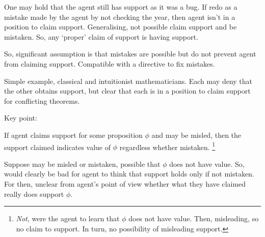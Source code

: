 \begin{note}[Support]
  One may hold that the agent still has support as it was a bug.
  If redo as a mistake made by the agent by not checking the year, then agent isn't in a position to claim support.
  Generalising, not possible claim support and be mistaken.
  So, any `proper' claim of support is having support.

  So, significant assumption is that mistakes are possible but do not prevent agent from claiming support.
  Compatible with a directive to fix mistakes.

  Simple example, classical and intuitionist mathematicians.
  Each may deny that the other obtains support, but clear that each is in a position to claim support for conflicting theorems.

  Key point:
  \begin{proposition}\label{prop:supp:independence}
    If agent claims support for some proposition \(\phi\) and may be misled, then the support claimed indicates value of \(\phi\) regardless whether mistaken.\nolinebreak
    \footnote{
      \emph{Not}, were the agent to learn that \(\phi\) does not have value.
      Then, misleading, so no claim to support.
      In turn, no possibility of misleading support.
    }
  \end{proposition}
  Suppose may be misled or mistaken, possible that \(\phi\) does not have value.
  So, would clearly be bad for agent to think that support holds only if not mistaken.
  For then, unclear from agent's point of view whether what they have claimed really does support \(\phi\).






\end{note}
